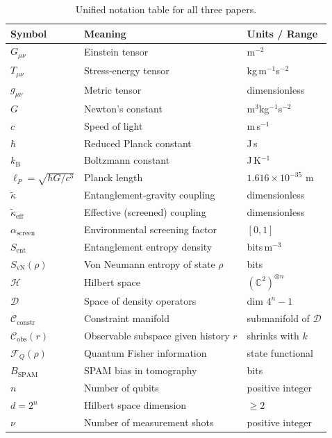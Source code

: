 \documentclass[12pt,letterpaper]{article}
\theoremstyle{plain}
\theoremstyle{definition}
\theoremstyle{remark}
\newcommand{\kB}{k_{\mathrm{B}}}
\newcommand{\Sent}{S_{\mathrm{ent}}}
\newcommand{\SvN}{S_{\mathrm{vN}}}
\newcommand{\FQ}{\mathcal{F}_Q}
\newcommand{\tkappaeff}{\tilde{\kappa}_{\mathrm{eff}}}
\newcommand{\ascreen}{\alpha_{\mathrm{screen}}}
\newcommand{\lP}{\ell_P}
\newcommand{\Hilb}{\mathcal{H}}
\newcommand{\Cconstr}{\mathcal{C}_{\mathrm{constr}}}
\newcommand{\Cdensity}{\mathcal{D}}
\newcommand{\Cobs}{\mathcal{C}_{\mathrm{obs}}}
\newcommand{\bias}{B_{\mathrm{SPAM}}}
\begin{document}
\begin{table}[H]
\centering
\caption{Unified notation table for all three papers.}
\renewcommand{\arraystretch}{1.3}
\begin{tabular}{@{}lll@{}}
\toprule
\textbf{Symbol} & \textbf{Meaning} & \textbf{Units / Range} \\
\midrule
$G_{\mu\nu}$ & Einstein tensor & m$^{-2}$ \\
$T_{\mu\nu}$ & Stress-energy tensor & kg\,m$^{-1}$s$^{-2}$ \\
$g_{\mu\nu}$ & Metric tensor & dimensionless \\
$G$ & Newton's constant & m$^3$kg$^{-1}$s$^{-2}$ \\
$c$ & Speed of light & m\,s$^{-1}$ \\
$\hbar$ & Reduced Planck constant & J\,s \\
$\kB$ & Boltzmann constant & J\,K$^{-1}$ \\
$\lP = \sqrt{\hbar G/c^3}$ & Planck length & $1.616\times10^{-35}$ m \\
$\tilde{\kappa}$ & Entanglement-gravity coupling & dimensionless \\
$\tkappaeff$ & Effective (screened) coupling & dimensionless \\
$\ascreen$ & Environmental screening factor & $[0, 1]$ \\
$\Sent$ & Entanglement entropy density & bits\,m$^{-3}$ \\
$\SvN(\rho)$ & Von Neumann entropy of state $\rho$ & bits \\
$\Hilb$ & Hilbert space & $(\mathbb{C}^2)^{\otimes n}$ \\
$\Cdensity$ & Space of density operators & dim $4^n - 1$ \\
$\Cconstr$ & Constraint manifold & submanifold of $\Cdensity$ \\
$\Cobs(r)$ & Observable subspace given history $r$ & shrinks with $k$ \\
$\FQ(\rho)$ & Quantum Fisher information & state functional \\
$\bias$ & SPAM bias in tomography & bits \\
$n$ & Number of qubits & positive integer \\
$d = 2^n$ & Hilbert space dimension & $\geq 2$ \\
$\nu$ & Number of measurement shots & positive integer \\
\bottomrule
\end{tabular}
\end{table}
\end{document}
